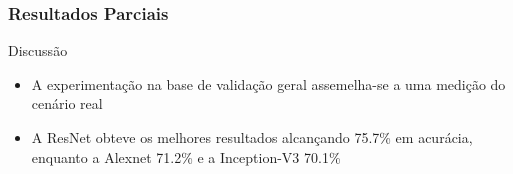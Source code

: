 \documentclass{beamer}
\begin{document}


\begin{frame}
\frametitle{Resultados Parciais}
 \begin{block}{Discussão}
\begin{itemize}
\pause
\item A experimentação na base de validação geral assemelha-se a uma medição do cenário real
\pause
\item A ResNet obteve os melhores resultados alcançando 75.7\% em acurácia, enquanto a Alexnet 71.2\% e a Inception-V3 70.1\%
\end{itemize}
\end{block}
\end{frame}
\end{document}
